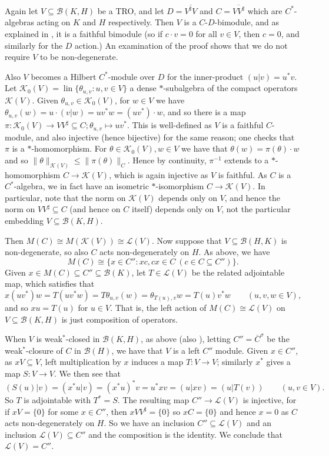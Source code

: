 \documentclass[a4paper,11pt]{article}
\theoremstyle{plain}
\theoremstyle{remark}
\newcommand{\mc}[1]{\mathcal{#1}}
\newcommand{\lin}{\operatorname{lin}}
\begin{document}
Again let $V\subseteq\mc B(K,H)$ be a TRO, and let $D = \overline{V^\sharp V}$ and $C = \overline{V V^\sharp}$ which are $C^*$-algebras acting on $K$ and $H$ respectively.  Then $V$ is a $C$-$D$-bimodule, and as explained in \cite{EOR_InjectivityNuclearityOS}, it is a faithful bimodule (so if $c\cdot v=0$ for all $v\in V$, then $c=0$, and similarly for the $D$ action.)  An examination of the proof shows that we do not require $V$ to be non-degenerate.

Also $V$ becomes a Hilbert $C^*$-module over $D$ for the inner-product $(u|v) = u^*v$.  Let $\mc K_0(V) = \lin\{\theta_{u,v} : u,v\in V \}$ a dense $*$-subalgebra of the compact operators $\mc K(V)$.  Given $\theta_{u,v}\in\mc K_0(V)$, for $w\in V$ we have $\theta_{u,v}(w) = u\cdot(v|w) = uv^*w = (uv^*)\cdot w$, and so there is a map $\pi \colon \mc K_0(V) \to VV^\sharp \subseteq C; \theta_{u,v} \mapsto uv^*$.  This is well-defined as $V$ is a faithful $C$-module, and also injective (hence bijective) for the same reason; one checks that $\pi$ is a $*$-homomorphism.  For $\theta\in\mc K_0(V), w\in V$ we have that $\theta(w) = \pi(\theta)\cdot w$ and so $\|\theta\|_{\mc K(V)} \leq \|\pi(\theta)\|_C$.  Hence by continuity, $\pi^{-1}$ extends to a $*$-homomorphism $C \to \mc K(V)$, which is again injective as $V$ is faithful.  As $C$ is a $C^*$-algebra, we in fact have an isometric $*$-isomorphism $C \to \mc K(V)$.  In particular, note that the norm on $\mc K(V)$ depends only on $V$, and hence the norm on $VV^\sharp \subseteq C$ (and hence on $C$ itself) depends only on $V$, not the particular embedding $V \subseteq \mc B(K,H)$.

Then $M(C) \cong M(\mc K(V)) \cong \mc L(V)$.  Now suppose that $V \subseteq \mc B(H,K)$ is non-degenerate, so also $C$ acts non-degenerately on $H$.  As above, we have
\[ M(C) \cong \{ x\in C'' : xc, cx\in C \ (c\in C \subseteq C'') \}. \]
Given $x\in M(C) \subseteq C'' \subseteq \mc B(K)$, let $T \in \mc L(V)$ be the related adjointable map, which satisfies that
\[ x (uv^*) w = T(uv^*w) = T \theta_{u,v}(w) = \theta_{T(u), v} w = T(u) v^* w \qquad (u,v,w\in V), \]
and so $xu = T(u)$ for $u\in V$.  That is, the left action of $M(C) \cong \mc L(V)$ on $V \subseteq \mc B(K,H)$ is just composition of operators.

When $V$ is weak$^*$-closed in $\mc B(K,H)$, as above (also \cite[pages~493--494]{EOR_InjectivityNuclearityOS}), letting $C'' = \overline{C}^\sigma$ be the weak$^*$-closure of $C$ in $\mc B(H)$, we have that $V$ is a left $C''$ module.  Given $x\in C''$, as $x V \subseteq V$, left multiplication by $x$ induces a map $T\colon V\to V$; similarly $x^*$ gives a map $S\colon V \to V$.  We then see that
\[ (S(u)|v) = (x^*u|v) = (x^*u)^*v = u^*xv = (u|xv) = (u|T(v)) \qquad (u,v\in V). \]
So $T$ is adjointable with $T^* = S$.  The resulting map $C'' \to \mc L(V)$ is injective, for if $x V = \{0\}$ for some $x\in C''$, then $x VV^\sharp=\{0\}$ so $xC=\{0\}$ and hence $x=0$ as $C$ acts non-degenerately on $H$.  So we have an inclusion $C'' \subseteq \mc L(V)$ and an inclusion $\mc L(V) \subseteq C''$ and the composition is the identity.  We conclude that $\mc L(V) = C''$.
\end{document}
